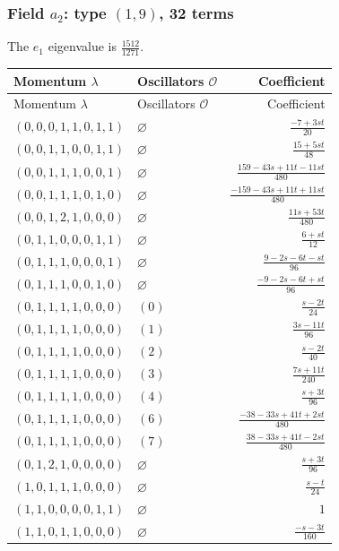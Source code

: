\subsubsection{\texorpdfstring{Field $a_{2}$: type $(1,9)$, 32 terms}{Field a2: type (1,9), 32 terms}}
The $e_1$ eigenvalue is $\frac{1512}{1271}$. 
\begingroup\scriptsize\setlength{\tabcolsep}{3pt}\renewcommand{\arraystretch}{1.35}
\begin{longtable}{@{}llr@{}}
\toprule Momentum $\lambda$&Oscillators $\mathcal O$&Coefficient\\\midrule\endfirsthead
\toprule Momentum $\lambda$&Oscillators $\mathcal O$&Coefficient\\\midrule\endhead
\bottomrule\endfoot
$(0,0,0,1,1,0,1,1)$ & $\varnothing$ & $\frac{-7+3st}{20}$\\
$(0,0,1,1,0,0,1,1)$ & $\varnothing$ & $\frac{15+5st}{48}$\\
$(0,0,1,1,1,0,0,1)$ & $\varnothing$ & $\frac{159-43s+11t-11st}{480}$\\
$(0,0,1,1,1,0,1,0)$ & $\varnothing$ & $\frac{-159-43s+11t+11st}{480}$\\
$(0,0,1,2,1,0,0,0)$ & $\varnothing$ & $\frac{11s+53t}{480}$\\
$(0,1,1,0,0,0,1,1)$ & $\varnothing$ & $\frac{6+st}{12}$\\
$(0,1,1,1,0,0,0,1)$ & $\varnothing$ & $\frac{9-2s-6t-st}{96}$\\
$(0,1,1,1,0,0,1,0)$ & $\varnothing$ & $\frac{-9-2s-6t+st}{96}$\\
$(0,1,1,1,1,0,0,0)$ & $(0)$ & $\frac{s-2t}{24}$\\
$(0,1,1,1,1,0,0,0)$ & $(1)$ & $\frac{3s-11t}{96}$\\
$(0,1,1,1,1,0,0,0)$ & $(2)$ & $\frac{s-2t}{40}$\\
$(0,1,1,1,1,0,0,0)$ & $(3)$ & $\frac{7s+11t}{240}$\\
$(0,1,1,1,1,0,0,0)$ & $(4)$ & $\frac{s+3t}{96}$\\
$(0,1,1,1,1,0,0,0)$ & $(6)$ & $\frac{-38-33s+41t+2st}{480}$\\
$(0,1,1,1,1,0,0,0)$ & $(7)$ & $\frac{38-33s+41t-2st}{480}$\\
$(0,1,2,1,0,0,0,0)$ & $\varnothing$ & $\frac{s+3t}{96}$\\
$(1,0,1,1,1,0,0,0)$ & $\varnothing$ & $\frac{s-t}{24}$\\
$(1,1,0,0,0,0,1,1)$ & $\varnothing$ & $1$\\
$(1,1,0,1,1,0,0,0)$ & $\varnothing$ & $\frac{-s-3t}{160}$\\

\end{longtable}
